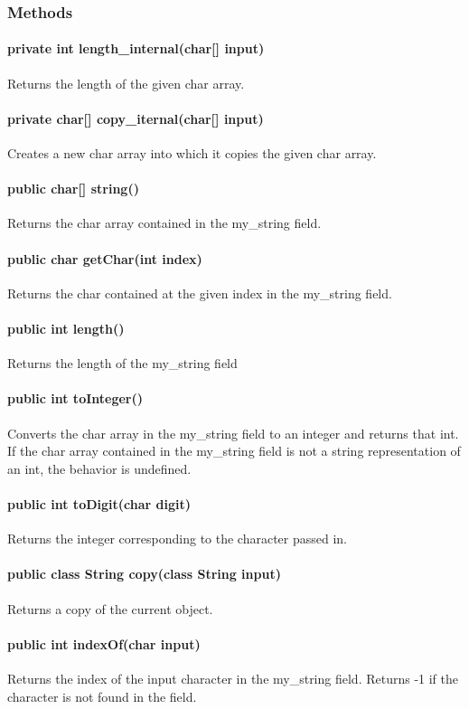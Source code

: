 \begin{homeworkProblem}
	\subsubsection{Methods}
	\paragraph{private int length\_internal(char[] input)}
	Returns the length of the given char array.
	\paragraph{private char[] copy\_iternal(char[] input)}
	Creates a new char array into which it copies the given char array.
	\paragraph{public char[] string()}
	Returns the char array contained in the my\_string field.
	\paragraph{public char getChar(int index)}
	Returns the char contained at the given index in the my\_string field.
	\paragraph{public int length()}
	Returns the length of the my\_string field
	\paragraph{public int toInteger()}
	Converts the char array in the my\_string field to an integer and returns that int. If the char array contained in the my\_string field is not a  string representation of an int, the behavior is undefined.
	\paragraph{public int toDigit(char digit)}
	Returns the integer corresponding to the character passed in.
	\paragraph{public class String copy(class String input)}
	Returns a copy of the current object.
	\paragraph{public int indexOf(char input)}
	Returns the index of the input character in the my\_string field. Returns -1 if the character is not found in the field.

\end{homeworkProblem}
